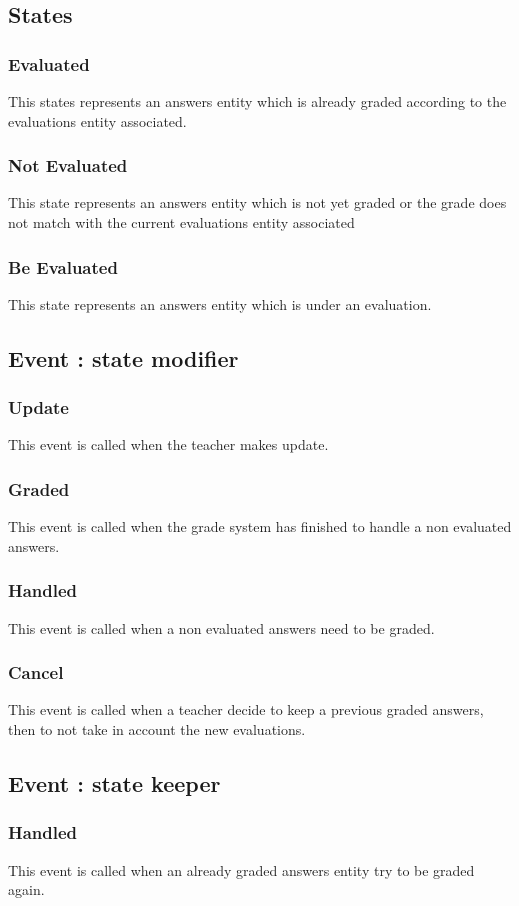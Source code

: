 	\subsection{States}
		\subsubsection{Evaluated}
			This states represents an answers entity which is already graded according to the evaluations entity associated.
		\subsubsection{Not Evaluated}
			This state represents an answers entity which is not yet graded or the grade does not match with the current evaluations entity associated
		\subsubsection{Be Evaluated}
			This state represents an answers entity which is under an evaluation.
	\subsection{Event : state modifier}
		\subsubsection{Update}
			This event is called when the teacher makes update. 
		\subsubsection{Graded}
			This event is called when the grade system has finished to handle a non evaluated answers.
		\subsubsection{Handled}		
			This event is called when a non evaluated answers need to be graded.
		\subsubsection{Cancel}
			This event is called when a teacher decide to keep a previous graded answers, then to not take in account the new evaluations.
	\subsection{Event : state keeper}
		\subsubsection{Handled}
			This event is called when an already graded answers entity try to be graded again.
